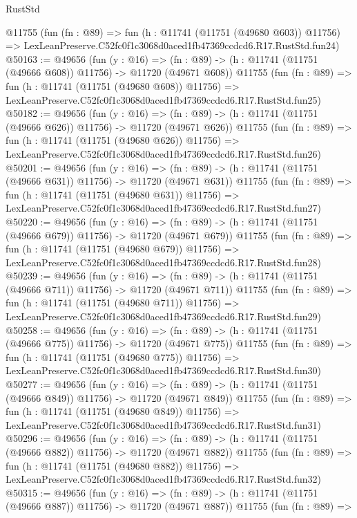 \begin{lexlean}{RustStd}
\begin{coremodule}
    @11755
    (fun (fn : @89) =>
    fun (h : @11741 (@11751 (@49680 @603)) @11756) =>
    LexLeanPreserve.C52fc0f1c3068d0aced1fb47369ccdcd6.R17.RustStd.fun24)
@50163 := @49656
    (fun (y : @16) =>
    (fn : @89) -> (h : @11741 (@11751 (@49666 @608)) @11756) -> @11720 (@49671 @608))
    @11755
    (fun (fn : @89) =>
    fun (h : @11741 (@11751 (@49680 @608)) @11756) =>
    LexLeanPreserve.C52fc0f1c3068d0aced1fb47369ccdcd6.R17.RustStd.fun25)
@50182 := @49656
    (fun (y : @16) =>
    (fn : @89) -> (h : @11741 (@11751 (@49666 @626)) @11756) -> @11720 (@49671 @626))
    @11755
    (fun (fn : @89) =>
    fun (h : @11741 (@11751 (@49680 @626)) @11756) =>
    LexLeanPreserve.C52fc0f1c3068d0aced1fb47369ccdcd6.R17.RustStd.fun26)
@50201 := @49656
    (fun (y : @16) =>
    (fn : @89) -> (h : @11741 (@11751 (@49666 @631)) @11756) -> @11720 (@49671 @631))
    @11755
    (fun (fn : @89) =>
    fun (h : @11741 (@11751 (@49680 @631)) @11756) =>
    LexLeanPreserve.C52fc0f1c3068d0aced1fb47369ccdcd6.R17.RustStd.fun27)
@50220 := @49656
    (fun (y : @16) =>
    (fn : @89) -> (h : @11741 (@11751 (@49666 @679)) @11756) -> @11720 (@49671 @679))
    @11755
    (fun (fn : @89) =>
    fun (h : @11741 (@11751 (@49680 @679)) @11756) =>
    LexLeanPreserve.C52fc0f1c3068d0aced1fb47369ccdcd6.R17.RustStd.fun28)
@50239 := @49656
    (fun (y : @16) =>
    (fn : @89) -> (h : @11741 (@11751 (@49666 @711)) @11756) -> @11720 (@49671 @711))
    @11755
    (fun (fn : @89) =>
    fun (h : @11741 (@11751 (@49680 @711)) @11756) =>
    LexLeanPreserve.C52fc0f1c3068d0aced1fb47369ccdcd6.R17.RustStd.fun29)
@50258 := @49656
    (fun (y : @16) =>
    (fn : @89) -> (h : @11741 (@11751 (@49666 @775)) @11756) -> @11720 (@49671 @775))
    @11755
    (fun (fn : @89) =>
    fun (h : @11741 (@11751 (@49680 @775)) @11756) =>
    LexLeanPreserve.C52fc0f1c3068d0aced1fb47369ccdcd6.R17.RustStd.fun30)
@50277 := @49656
    (fun (y : @16) =>
    (fn : @89) -> (h : @11741 (@11751 (@49666 @849)) @11756) -> @11720 (@49671 @849))
    @11755
    (fun (fn : @89) =>
    fun (h : @11741 (@11751 (@49680 @849)) @11756) =>
    LexLeanPreserve.C52fc0f1c3068d0aced1fb47369ccdcd6.R17.RustStd.fun31)
@50296 := @49656
    (fun (y : @16) =>
    (fn : @89) -> (h : @11741 (@11751 (@49666 @882)) @11756) -> @11720 (@49671 @882))
    @11755
    (fun (fn : @89) =>
    fun (h : @11741 (@11751 (@49680 @882)) @11756) =>
    LexLeanPreserve.C52fc0f1c3068d0aced1fb47369ccdcd6.R17.RustStd.fun32)
@50315 := @49656
    (fun (y : @16) =>
    (fn : @89) -> (h : @11741 (@11751 (@49666 @887)) @11756) -> @11720 (@49671 @887))
    @11755
    (fun (fn : @89) =>

\end{coremodule}
\end{lexlean}
